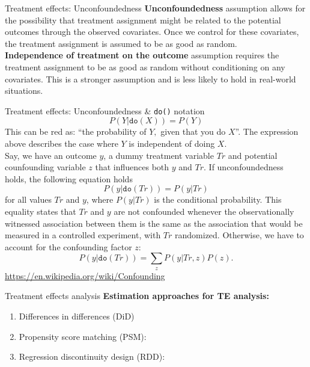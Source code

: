 \documentclass{beamer}
\begin{document}
\begin{frame}{Treatment effects: Unconfoundedness}
\textbf{Unconfoundedness} assumption allows for the possibility that treatment assignment might be related to the potential outcomes through the observed covariates. Once we control for these covariates, the treatment assignment is assumed to be as good as random. \\
\bigskip
\textbf{Independence of treatment on the outcome} assumption requires the treatment assignment to be as good as random without conditioning on any covariates. This is a stronger assumption and is less likely to hold in real-world situations.
\end{frame}
\begin{frame}{Treatment effects: Unconfoundedness \& \texttt{do()} notation}
\small 
$$P(Y|\texttt{do}(X)) = P(Y)$$ 
This can be red as: ``the probability of $Y,$ given that you do  $X$''. The expression above describes the case where $Y$ is independent of doing $X$.\\
\bigskip
Say, we have an outcome $y$, a dummy treatment variable $\textit{Tr}$ and potential counfounding variable $z$ that influences both $y$ and $\textit{Tr}$. If unconfoundedness holds, the following equation holds
$$P(y | \texttt{do}(\textit{Tr})) = P(y|\textit{Tr})$$
for all values $\textit{Tr}$ and $y$, where $P(y|\textit{Tr})$ is the conditional probability. This equality states that $\textit{Tr}$ and $y$ are not confounded whenever the observationally witnessed association between them is the same as the association that would be measured in a controlled experiment, with $\textit{Tr}$ randomized. Otherwise, we have to account for the confounding factor $z$:
$$P(y | \texttt{do}(\textit{Tr})) = \sum_z P(y|\textit{Tr},z)P(z). $$
\centering
\url{https://en.wikipedia.org/wiki/Confounding}
\end{frame}
\begin{frame}{Treatment effects analysis}
\textbf{Estimation approaches for TE analysis:}\\
\bigskip
\begin{enumerate}
    \item Differences in differences (DiD)
    \bigskip
    \item Propensity score matching (PSM):
    \bigskip
    \item Regression discontinuity design (RDD):
\end{enumerate}
\end{frame}
\end{document}
